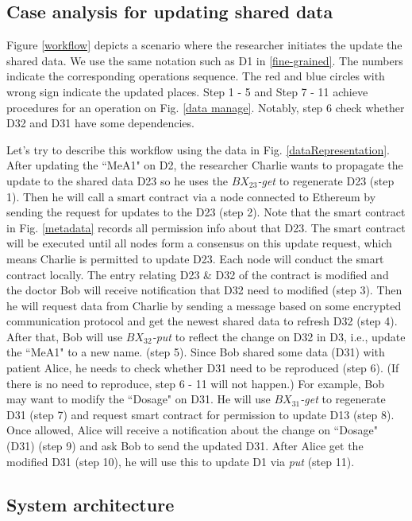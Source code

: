 \documentclass[conference]{IEEEtran}
\begin{document}
\subsection{Case analysis for updating shared data}
\label{updateCase}

Figure \ref{workflow} depicts a scenario where the researcher initiates the update the shared data. We use the same notation such as D1 in \ref{fine-grained}. The numbers indicate the corresponding operations sequence. The red and blue circles with wrong sign indicate the updated places. Step 1 - 5 and Step 7 - 11 achieve procedures for an operation on Fig. \ref{data manage}. Notably, step 6 check whether D32 and D31 have some dependencies.  

Let's try to describe this workflow using the data in Fig. \ref{dataRepresentation}. After updating the ``MeA1" on D2, the researcher Charlie wants to propagate the update to the shared data D23 so he uses the \emph{$BX_{23}$-get} to regenerate D23 (step 1). Then he will call a smart contract via a node connected to Ethereum by sending the request for updates to the D23 (step 2). Note that the smart contract in Fig. \ref{metadata}  records all permission info about that D23. 
The smart contract will be executed until all nodes form a consensus on this update request, which means Charlie is permitted to update D23. Each node will conduct the smart contract locally. The entry relating D23 \& D32 of the contract is modified and the doctor Bob will receive notification that D32 need to modified (step 3). Then he will request data from Charlie by sending a message based on some encrypted communication protocol and get the newest shared data to refresh D32 (step 4). After that, Bob will use \emph{$BX_{32}$-put} to reflect the change on D32 in D3, i.e., update the ``MeA1" to a new name. (step 5). Since Bob shared some data (D31) with patient Alice, he needs to check whether D31 need to be reproduced (step 6). (If there is no need to reproduce, step 6 - 11 will not happen.) For example, Bob may want to modify the ``Dosage" on D31. He will use \emph{$BX_{31}$-get} to regenerate D31 (step 7) and request smart contract for permission to update D13 (step 8). Once allowed, Alice will receive a notification about the change on ``Dosage" (D31) (step 9) and ask Bob to send the updated D31. After Alice get the modified D31 (step 10), he will use this to update D1 via \emph{put} (step 11).  

\subsection{System architecture}
\label{architecture}
\end{document}
